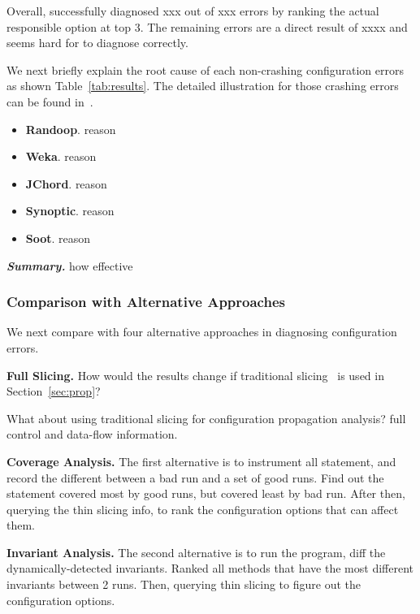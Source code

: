 Overall, \ourtool successfully diagnosed xxx out of xxx errors
by ranking the actual responsible option at top 3.
The remaining errors are a direct result of xxxx and seems
hard for \ourtool to diagnose correctly.


We next briefly explain the root cause of each non-crashing configuration
errors as shown Table~\ref{tab:results}. The detailed illustration
for those crashing errors can be found in~\cite{Rabkin:2011:PPC}.

\begin{itemize}
\item \textbf{Randoop}. reason
\item \textbf{Weka}. reason
\item \textbf{JChord}. reason
\item \textbf{Synoptic}. reason
\item \textbf{Soot}. reason
\end{itemize}


\vspace{1mm}
\noindent \textbf{\textit{Summary.}} how effective


\subsubsection{Comparison with Alternative Approaches}
\label{sec:comparison}

We next compare \ourtool with four alternative approaches
in diagnosing configuration errors.

\noindent \textbf{Full Slicing.}
How would the results change if traditional slicing~\cite{Horwitz:1988} is used
in Section~\ref{sec:prop}?

What about using traditional slicing for configuration propagation analysis?
full control and data-flow information.

\vspace{1mm}
\noindent \textbf{Coverage Analysis.}
The first alternative is to instrument all statement, and record the different between a bad run and
a set of good runs. Find out the statement covered most by good runs, but covered least by bad run.
After then, querying the thin slicing info, to rank the configuration options that can affect them.

\vspace{1mm}
\noindent \textbf{Invariant Analysis.}
The second alternative is to run the program, diff the dynamically-detected invariants. Ranked all
methods that have the most different invariants between 2 runs. Then, querying thin slicing to
figure out the configuration options.


